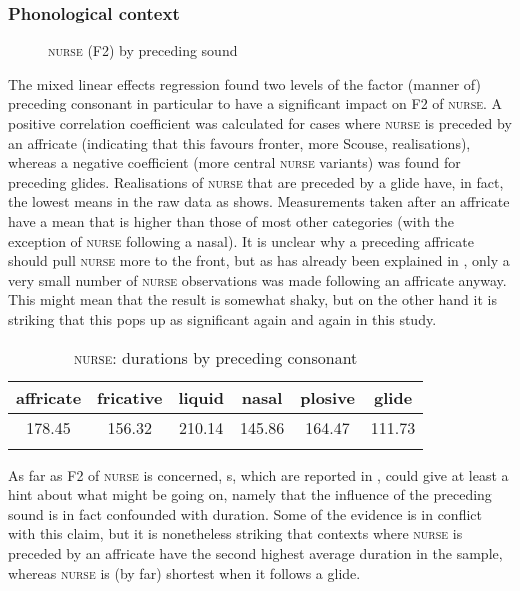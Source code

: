 \subsubsection{Phonological context}
\label{sec.prod.res.vow.nurse.f2.phon}

\begin{figure}
	
		\resizebox{0.5\linewidth}{!}{} 
	\caption{\textsc{nurse} (F2) by preceding sound}
	\label{fig.box.f2w.nurse.presound}
\end{figure}

The mixed linear effects regression found two levels of the factor (manner of) preceding consonant in particular to have a significant impact on F2 of \textsc{nurse}.
A positive correlation coefficient was calculated for cases where \textsc{nurse} is preceded by an affricate (indicating that this  favours fronter, more Scouse, realisations), whereas a negative coefficient (more central \textsc{nurse} variants) was found for preceding glides.
Realisations of \textsc{nurse} that are preceded by a glide have, in fact, the lowest means in the raw data as  shows.
Measurements taken after an affricate have a mean that is higher than those of most other categories (with the exception of \textsc{nurse} following a nasal).
It is unclear why a preceding affricate should pull \textsc{nurse} more to the front, but as has already been explained in , only a very small number of \textsc{nurse} observations was made following an affricate anyway.
This might mean that the result is somewhat shaky, but on the other hand it is striking that this  pops up as significant again and again in this study.

\begin{table}
	
	\caption{\textsc{nurse}: durations by preceding consonant}
	\label{tab.dur.phon.nurse}
	\begin{tabular}{cccccc}
		\lsptoprule
		affricate & fricative & liquid & nasal & plosive & glide\\
		\midrule
		178.45 & 156.32 & 210.14 & 145.86 & 164.47 & 111.73\\
		\lspbottomrule
	\end{tabular}
\end{table}

As far as F2 of \textsc{nurse} is concerned, s, which are reported in , could give at least a hint about what might be going on, namely that the influence of the preceding sound is in fact confounded with duration.
Some of the evidence is in conflict with this claim, but it is nonetheless striking that contexts where \textsc{nurse} is preceded by an affricate have the second highest average duration in the sample, whereas \textsc{nurse} is (by far) shortest when it follows a glide.

